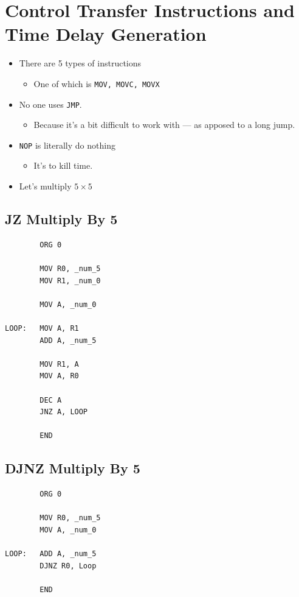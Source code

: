 \documentclass[12pt]{article}
\begin{document}
\section{Control Transfer Instructions and Time Delay Generation}
\begin{itemize}
    \item There are 5 types of instructions
    \begin{itemize}
         \item One of which is \texttt{MOV, MOVC, MOVX}
    \end{itemize}

    \item No one uses \texttt{JMP}.
    \begin{itemize}
        \item Because it's a bit difficult to work with --- as apposed to a long jump.
    \end{itemize}

    \item \texttt{NOP} is literally do nothing
    \begin{itemize}
        \item It's to kill time.
    \end{itemize}

    \item Let's multiply $5 \times 5$
\end{itemize}

\subsection*{JZ Multiply By 5}
\begin{verbatim}
        ORG 0

        MOV R0, _num_5
        MOV R1, _num_0

        MOV A, _num_0

LOOP:   MOV A, R1
        ADD A, _num_5

        MOV R1, A
        MOV A, R0

        DEC A
        JNZ A, LOOP

        END
\end{verbatim}

\subsection*{DJNZ Multiply By 5}
\begin{verbatim}
        ORG 0

        MOV R0, _num_5
        MOV A, _num_0

LOOP:   ADD A, _num_5
        DJNZ R0, Loop

        END
\end{verbatim}
\end{document}
